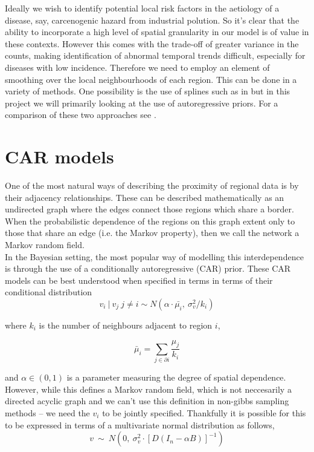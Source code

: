 \documentclass[11pt]{report}
\begin{document}
Ideally we wish to identify potential local risk factors in the aetiology of a disease, say, carcenogenic hazard from industrial polution. So it's clear that the ability to incorporate a high level of spatial granularity in our model is of value in these contexts. However this comes with the trade-off of greater variance in the counts, making identification of abnormal temporal trends difficult, especially for diseases with low incidence. Therefore we need to employ an element of smoothing over the local neighbourhoods of each region. This can be done in a variety of methods. One possibility is the use of splines such as in \citet{spline} but in this project we will primarily looking at the use of autoregressive priors. For a comparison of these two approaches see \cite{splinecompare}.   

\section{CAR models} \label{carmodel}

One of the most natural ways of describing the proximity of regional data is by their adjacency relationships. These can be described mathematically as an undirected graph where the edges connect those regions which share a border. When the probabilistic dependence of the regions on this graph extent only to those that share an edge (i.e. the Markov property), then we call the network a Markov random field. \\ 

In the Bayesian setting, the most popular way of modelling this interdependence is through the use of a conditionally autoregressive (CAR) prior. These CAR models can be best understood when specified in terms in terms of their conditional distribution
\begin{equation}
v_i \ | \ v_j \ j \neq i \sim N(\alpha \cdot \bar{\mu_i}, \ \sigma_v^2/k_i)
\end{equation}

where $k_i$ is the number of neighbours adjacent to region $i$,

\begin{equation}
\bar{\mu}_i = \sum_{j \in \partial i} \frac{\mu_j}{k_i}
\end{equation}

and $\alpha \in (0, 1)$ is a parameter measuring the degree of spatial dependence. \\

However, while this defines a Markov random field, which is not neccesarily a directed acyclic graph and we can't use this definition in non-gibbs sampling methods -- we need the $v_i$ to be jointly specified. Thankfully it is possible \citep{banerjeebook} for this to be expressed in terms of a multivariate normal distribution as follows,
\begin{equation} \label{eq:car}
v \ \sim \ N(0, \ \sigma_v^2 \cdot {[D(I_n - \alpha B)]}^{-1})
\end{equation}
\end{document}
